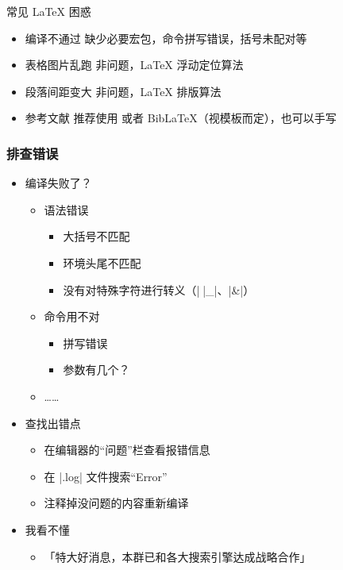 \begin{frame}{常见 \LaTeX{} 困惑}
  \begin{itemize}
    \item \alert{编译不通过} 缺少必要宏包，命令拼写错误，括号未配对等
    \item \alert{表格图片乱跑} 非问题，\LaTeX{} 浮动定位算法 
    \item \alert{段落间距变大} 非问题，\LaTeX{} 排版算法
    \item \alert{参考文献} 推荐使用 \BibTeX 或者 Bib\LaTeX（视模板而定），也可以手写  
  \end{itemize}
\end{frame}

\begin{frame}[fragile]
  \frametitle{排查错误}
    \begin{itemize}
      \item<+-> 编译失败了？
        \begin{itemize}
          \item 语法错误
            \begin{itemize}
              \item 大括号不匹配
              \item 环境头尾不匹配
              \item 没有对特殊字符进行转义（|\|、|_|、|&|）
            \end{itemize}
  
        \item 命令用不对
          \begin{itemize}
            \item 拼写错误
            \item 参数有几个？
          \end{itemize}
        \item ……
      \end{itemize}
  
      \item<+-> 查找出错点
      \begin{itemize}
        \item 在编辑器的“问题”栏查看报错信息
        \item 在 |.log| 文件搜索“Error”
        \item 注释掉没问题的内容重新编译
      \end{itemize}
  
      \item<+-> 我看不懂
      \begin{itemize}
        \item<+-> \alert{「特大好消息，本群已和各大搜索引擎达成战略合作」}
      \end{itemize}
    \end{itemize}
  \end{frame}

